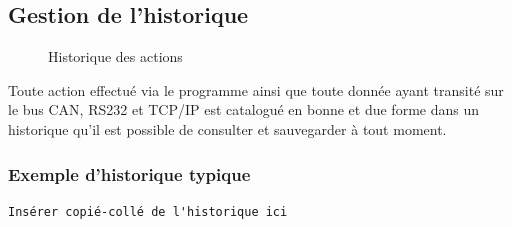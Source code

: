 \documentclass[10pt,a4paper,final]{article}
\begin{document}
\begin{spacing}{1.5}
\subsection{Gestion de l'historique}
\begin{figure}[hbtp]
\caption{Historique des actions}
\centering
{}
\end{figure}
Toute action effectué via le programme ainsi que toute donnée ayant transité sur le bus CAN, RS232 et TCP/IP est catalogué en bonne et due forme dans un historique qu'il est possible de consulter et sauvegarder à tout moment.

\subsubsection{Exemple d'historique typique}
\end{spacing}
\begin{verbatim}
Insérer copié-collé de l'historique ici
\end{verbatim}
\end{document}
